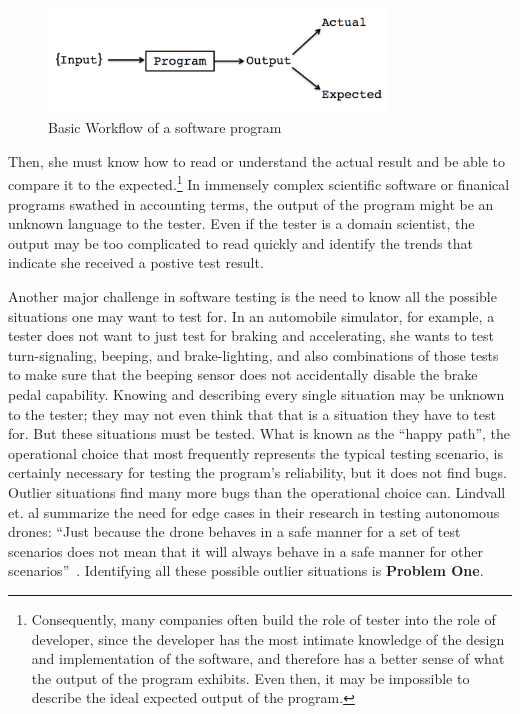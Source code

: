 \begin{figure}
\centering
\includegraphics[width=90mm,scale=0.5]{diagram.png}
\caption{Basic Workflow of a software program}
\label{fig:workflow}
\end{figure}

Then, she must know how to read or understand the actual result and be able to compare it to the expected.\footnote{Consequently, many companies often build the role of tester into the role of developer, since the developer has the most intimate knowledge of the design and implementation of the software, and therefore has a better sense of what the output of the program exhibits. Even then, it may be impossible to describe the ideal expected output of the program.} In immensely complex scientific software or finanical programs swathed in accounting terms, the output of the program might be an unknown language to the tester. Even if the tester is a domain scientist, the output may be too complicated to read quickly and identify the trends that indicate she received a postive test result.

Another major challenge in software testing is the need to know all the possible situations one may want to test for. In an automobile simulator, for example, a tester does not want to just test for braking and accelerating, she wants to test turn-signaling, beeping, and brake-lighting, and also combinations of those tests to make sure that the beeping sensor does not accidentally disable the brake pedal capability. Knowing and describing every single situation may be unknown to the tester; they may not even think that that is a situation they have to test for. But these situations must be tested. What is known as the ``happy path'', the operational choice that most frequently represents the typical testing scenario, is certainly necessary for testing the program’s reliability, but it does not find bugs. Outlier situations find many more bugs than the operational choice can. Lindvall et. al summarize the need for edge cases in their research in testing autonomous drones: ``Just because the drone behaves in a safe manner for a set of test scenarios does not mean that it will always behave in a safe manner for other scenarios''~\cite{Lindvall:2017:MMT:3103620.3103632}. Identifying all these possible outlier situations is \textbf{Problem One}.

